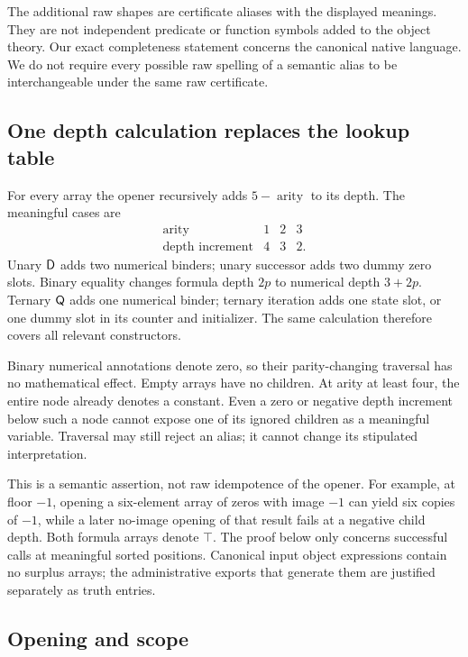 The additional raw shapes are certificate aliases with the displayed
meanings.  They are not independent predicate or function symbols added
to the object theory.  Our exact completeness statement concerns the
canonical native language.  We do not require every possible raw spelling
of a semantic alias to be interchangeable under the same raw certificate.

\subsection{One depth calculation replaces the lookup table}

For every array the opener recursively adds $5-\operatorname{arity}$
to its depth.  The meaningful cases are
\[
\begin{array}{c|ccc}
 \operatorname{arity}&1&2&3\\\hline
 \text{depth increment}&4&3&2.
\end{array}
\]
Unary $\mathsf D$ adds two numerical binders; unary successor adds two dummy
zero slots.  Binary equality changes formula depth $2p$ to numerical
depth $3+2p$.  Ternary $\mathsf Q$ adds one numerical binder; ternary iteration
adds one state slot, or one dummy slot in its counter and initializer.
The same calculation therefore covers all relevant constructors.

Binary numerical annotations denote zero, so their parity-changing
traversal has no mathematical effect.  Empty arrays have no children.
At arity at least four, the entire node already denotes a constant.
Even a zero or negative depth increment below such a node cannot expose
one of its ignored children as a meaningful variable.  Traversal may
still reject an alias; it cannot change its stipulated interpretation.

This is a semantic assertion, not raw idempotence of the opener.
For example, at floor $-1$, opening a six-element array of zeros with
image $-1$ can yield six copies of $-1$, while a later no-image opening
of that result fails at a negative child depth.  Both formula arrays
denote $\top$.  The proof below only concerns successful calls at meaningful
sorted positions.  Canonical input object expressions contain no surplus
arrays; the administrative exports that generate them are justified
separately as truth entries.

\subsection{Opening and scope}
\label{subsec:opening-lemma}


